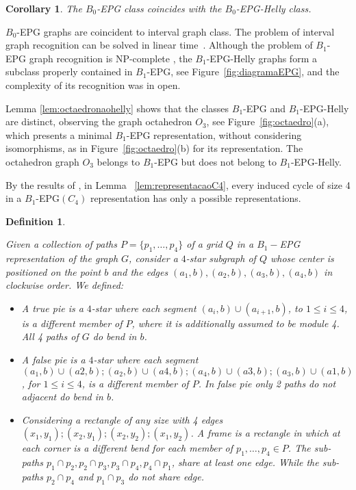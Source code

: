 \documentclass[a4paper,11pt]{article}
\newtheorem{defi}[theorem]{Definition}
\newtheorem{coro}[theorem]{Corollary}
\begin{document}
\begin{coro}
The  $B_0$-EPG class coincides with the $B_0$-EPG-Helly class.
\end{coro}

$B_0$-EPG graphs are coincident to interval graph class. The problem of interval graph recognition can be solved in linear time~\citep{booth1976}. Although the problem of $ B_1$-EPG graph recognition is NP-complete \citep {heldt2014}, the $ B_1$-EPG-Helly graphs form a subclass properly contained in $ B_1$-EPG, see Figure~\ref{fig:diagramaEPG}, and the complexity of its recognition was in open. 

Lemma \ref{lem:octaedronaohelly} shows that the classes $ B_1$-EPG and $ B_1$-EPG-Helly are distinct, observing the graph octahedron $ O_3 $, see Figure~\ref{fig:octaedro}(a), which presents a minimal $B_1$-EPG representation, without considering isomorphisms, as in Figure~\ref{fig:octaedro}(b) for its representation. The octahedron graph $ O_3 $ belongs to $ B_1$-EPG but does not belong to $ B_1$-EPG-Helly.



By the results of \citep{golumbic2009}, in Lemma ~\ref{lem:representacaoC4}, every induced cycle of size 4 in a $ B_1$-EPG$(C_4)$ representation has only a possible representations.%

\begin{defi} \label{defi:tortasFrame}

\citep{golumbic2009} Given a collection of paths $ P = \{p_1, \dots , p_4\}$ of a grid $ Q $ in a $ B_1-$EPG representation of the graph $ G$, consider a $ 4$-star subgraph  of $ Q $ whose center is positioned on the point $ b $ and the edges $ (a_1, b), (a_2, b), (a_3, b), (a_4, b)$ in clockwise order. We defined:

\begin{itemize}
\item A \emph{true pie} is a $ 4$-star where each segment $(a_i, b) \cup (a_ {i + 1}, b) $, to $ 1 \leq i \leq 4 $, is a different member of $ P $, where it is additionally assumed to be module 4. All 4 paths of $ G $ do bend in $ b $.

\item A \emph {false pie} is a $ 4$-star where each segment $ (a_1, b) \cup (a2, b); (a_2, b) \cup (a4, b); (a_4, b) \cup (a3, b); (a_3, b) \cup (a1, b) $, for $ 1 \leq i \leq 4 $, is a different member of $ P $. In false pie only 2 paths do not adjacent do bend in $b$.

\item Considering a rectangle of any size with 4 edges $ (x_1, y_1); (x_2, y_1); (x_2, y_2); (x_1, y_2) $. A \emph{frame} is a rectangle in which at each corner is a different bend for each member of $ p_1, \dots, p_4 \in P $. The sub-paths $ p_1 \cap p_2, p_2 \cap p_3, p_3 \cap p_4, p_4 \cap p_1 $, share at least one edge. While the sub-paths $ p_2 \cap p_4 $ and $ p_1 \cap p_3 $ do not share edge.
\end{itemize}
\end{defi}
\end{document}

